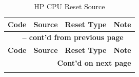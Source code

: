 \documentclass[main\_\_EN.tex]{subfiles}
\begin{document}
\begin{longtable}[c]{ |l|m{3.5cm}|m{2.7cm}|m{8.7cm}| }
    \caption{HP CPU Reset Source}
    \label{tab:resclk-hp-reset-src}\\\hline

    \rowcolor{lightgray}
    \textbf{Code} & \textbf{Source} & \textbf{Reset Type} &  \textbf{Note} \\\hline
    \endfirsthead


    \multicolumn{4}{c}{\bfseries \tablename\ \thetable{} -- cont'd from previous page}\\\hline
    \rowcolor{lightgray}
    \textbf{Code} & \textbf{Source} & \textbf{Reset Type} &  \textbf{Note} \\\hline
    \endhead

    \multicolumn{4}{r}{\textbf{Cont'd on next page}} \\
    \endfoot


\end{longtable}
\end{document}
